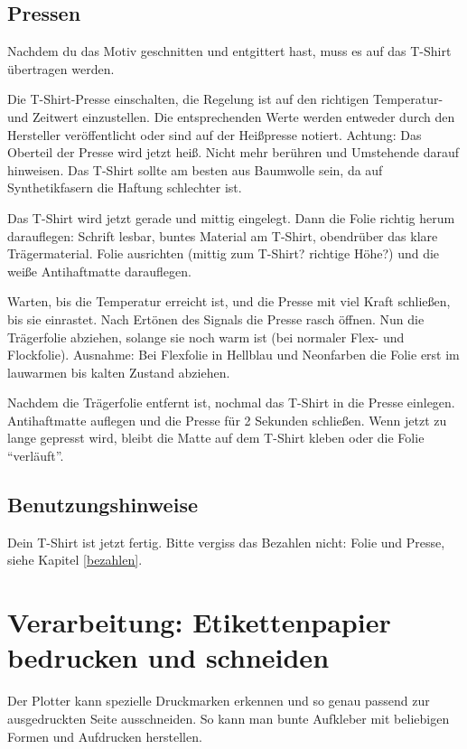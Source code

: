 \documentclass{\basedir/fablab-document}
\begin{document}
\subsection{Pressen}
Nachdem du das Motiv geschnitten und entgittert hast, muss es auf das T-Shirt übertragen werden.

Die T-Shirt-Presse einschalten, die Regelung ist auf den richtigen Temperatur- und Zeitwert einzustellen.
Die entsprechenden Werte werden entweder durch den Hersteller veröffentlicht oder sind auf der Heißpresse notiert.
Achtung: Das Oberteil der Presse wird jetzt heiß.
Nicht mehr berühren und Umstehende darauf hinweisen.
Das T-Shirt sollte am besten aus Baumwolle sein, da auf Synthetikfasern die Haftung schlechter ist.

Das T-Shirt wird jetzt gerade und mittig eingelegt.
Dann die Folie richtig herum darauflegen: Schrift lesbar, buntes Material am T-Shirt, obendrüber das klare Trägermaterial.
Folie ausrichten (mittig zum T-Shirt? richtige Höhe?) und die weiße Antihaftmatte darauflegen.

Warten, bis die Temperatur erreicht ist, und die Presse mit viel Kraft schließen, bis sie einrastet.
Nach Ertönen des Signals die Presse rasch öffnen.
Nun die Trägerfolie abziehen, solange sie noch warm ist (bei normaler Flex- und Flockfolie).
Ausnahme: Bei Flexfolie in Hellblau und Neonfarben die Folie erst im lauwarmen bis kalten Zustand abziehen.

Nachdem die Trägerfolie entfernt ist, nochmal das T-Shirt in die Presse einlegen.
Antihaftmatte auflegen und die Presse für 2 Sekunden schließen.
Wenn jetzt zu lange gepresst wird, bleibt die Matte auf dem T-Shirt kleben oder die Folie \enquote{verläuft}.

\subsection{Benutzungshinweise}
Dein T-Shirt ist jetzt fertig.
Bitte vergiss das Bezahlen nicht: Folie und Presse, siehe Kapitel \ref{bezahlen}.

\section{Verarbeitung: Etikettenpapier bedrucken und schneiden}

Der Plotter kann spezielle Druckmarken erkennen und so genau passend zur ausgedruckten Seite ausschneiden. So kann man bunte Aufkleber mit beliebigen Formen und Aufdrucken herstellen.
\end{document}
